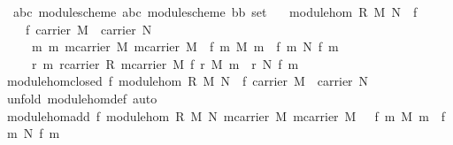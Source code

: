 \begin{isabellebody}
\ \ {\isacharparenleft}{\isacharprime}a{\isacharcomma}{\isacharprime}b{}{\isacharcomma}{\isacharprime}c{}{\isacharparenright}\ module{\isacharunderscore}scheme{\isacharcomma}\ {\isacharparenleft}{\isacharprime}a{\isacharcomma}{\isacharprime}b{}{\isacharcomma}{\isacharprime}c{}{\isacharparenright}\ module{\isacharunderscore}scheme{\isacharbrackright}\ {\isasymRightarrow}{\isacharparenleft}{\isacharprime}b{}{\isasymRightarrow}{\isacharprime}b{}{\isacharparenright}\ set{\isachardoublequoteclose}\isanewline
\ \ \ {\isachardoublequoteopen}module{\isacharunderscore}hom\ R\ M\ N\ {\isacharequal}\ {\isacharbraceleft}f{\isachardot}\ \isanewline
\ \ \ \ {\isacharparenleft}{\isacharparenleft}f{\isasymin}\ carrier\ M\ {\isasymrightarrow}\ carrier\ N{\isacharparenright}\isanewline
\ \ \ \ {\isasymand}\ {\isacharparenleft}{\isasymforall}m{}\ m{}{\isachardot}\ m{}{\isasymin}carrier\ M{\isasymand}\ m{}{\isasymin}carrier\ M\ {\isasymlongrightarrow}\ f\ {\isacharparenleft}m{}\ {\isasymoplus}\isactrlbsub M\isactrlesub \ m{}{\isacharparenright}\ {\isacharequal}\ {\isacharparenleft}f\ m{}{\isacharparenright}\ {\isasymoplus}\isactrlbsub N\isactrlesub \ {\isacharparenleft}f\ m{}{\isacharparenright}{\isacharparenright}\isanewline
\ \ \ \ {\isasymand}\ {\isacharparenleft}{\isasymforall}r\ m{\isachardot}\ r{\isasymin}carrier\ R{\isasymand}\ m{\isasymin}carrier\ M\ {\isasymlongrightarrow}f\ {\isacharparenleft}r\ {\isasymodot}\isactrlbsub M\isactrlesub \ m{\isacharparenright}\ {\isacharequal}\ r\ {\isasymodot}\isactrlbsub N\isactrlesub \ {\isacharparenleft}f\ m{\isacharparenright}{\isacharparenright}{\isacharparenright}{\isacharbraceright}{\isachardoublequoteclose}\isanewline
\isanewline
{}\isamarkupfalse%
\ module{\isacharunderscore}hom{\isacharunderscore}closed{\isacharcolon}\ {\isachardoublequoteopen}f{\isasymin}\ module{\isacharunderscore}hom\ R\ M\ N\ {\isasymLongrightarrow}\ f{\isasymin}\ carrier\ M\ {\isasymrightarrow}\ carrier\ N{\isachardoublequoteclose}\isanewline
%
\isadelimproof
%
\endisadelimproof
%
\isatagproof
{}\isamarkupfalse%
\ {\isacharparenleft}unfold\ module{\isacharunderscore}hom{\isacharunderscore}def{\isacharcomma}\ auto{\isacharparenright}%
\endisatagproof
{\isafoldproof}%
%
\isadelimproof
\isanewline
%
\endisadelimproof
\isanewline
{}\isamarkupfalse%
\ module{\isacharunderscore}hom{\isacharunderscore}add{\isacharcolon}\ {\isachardoublequoteopen}{\isasymlbrakk}f{\isasymin}\ module{\isacharunderscore}hom\ R\ M\ N{\isacharsemicolon}\ m{}{\isasymin}carrier\ M{\isacharsemicolon}\ m{}{\isasymin}carrier\ M\ {\isasymrbrakk}\ {\isasymLongrightarrow}\ f\ {\isacharparenleft}m{}\ {\isasymoplus}\isactrlbsub M\isactrlesub \ m{}{\isacharparenright}\ {\isacharequal}\ {\isacharparenleft}f\ m{}{\isacharparenright}\ {\isasymoplus}\isactrlbsub N\isactrlesub \ {\isacharparenleft}f\ m{}{\isacharparenright}{\isachardoublequoteclose}\isanewline

\end{isabellebody}
